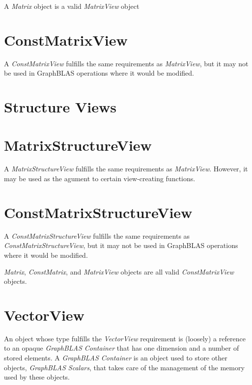 
A \emph{Matrix} object is a valid \emph{MatrixView} object

\section{ConstMatrixView}

A \textit{ConstMatrixView} fulfills the same requirements as \textit{MatrixView}, but it may not be used in GraphBLAS operations where it would be modified.

\section{Structure Views}
\section{MatrixStructureView}
A \textit{MatrixStructureView} fulfills the same requirements as \textit{MatrixView}.  However, it may be used as the agument to certain view-creating functions.

\section{ConstMatrixStructureView}
A \textit{ConstMatrixStructureView} fulfills the same requirements as \textit{ConstMatrixStructureView}, but it may not be used in GraphBLAS operations where it would be modified.


\emph{Matrix}, \emph{ConstMatrix}, and \emph{MatrixView} objects are all valid \emph{ConstMatrixView} objects.

\section{VectorView}

An object whose type fulfills the \textit{VectorView} requirement is (loosely) a 
reference to an opaque \textit{GraphBLAS Container} that has one dimension and a 
number of stored elements.  A \textit{GraphBLAS Container} is an object used to store
other objects, \textit{GraphBLAS Scalars}, that takes care of the management of the
memory used by these objects. 

